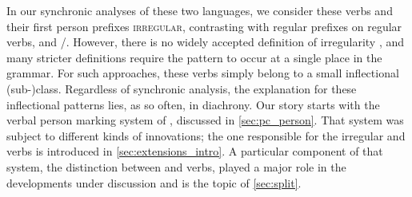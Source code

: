 In our synchronic analyses of these two languages, we consider these verbs and their first person prefixes \textsc{irregular}, contrasting with regular prefixes on regular  verbs,  and /.
However, there is no widely accepted definition of irregularity \parencite{stolz2012introduction}, and many stricter definitions \parencite[][e.g.]{haspelmath2010understanding} require the pattern to occur at a single place in the grammar.
For such approaches, these verbs simply belong to a small inflectional (sub-)class. %
Regardless of synchronic analysis, the explanation for these inflectional patterns lies, as so often, in diachrony.
Our story starts with the verbal person marking system of \PC, discussed in \cref{sec:pc_person}.
That system was subject to different kinds of innovations; the one responsible for the irregular \hixka and \trio verbs is introduced in \cref{sec:extensions_intro}.
A particular component of that system, the distinction between  and  verbs, played a major role in the developments under discussion and is the topic of \cref{sec:split}.

%






